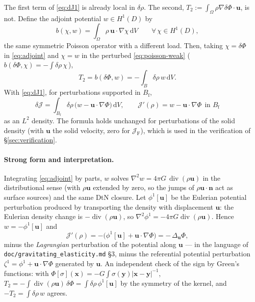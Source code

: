 \documentclass[11pt]{article}
\newcommand{\Jf}{\mathscr{J}}  %
\newcommand{\Bf}{B_{\mathrm{f}}}
\newcommand{\bu}{\mathbf{u}}
\newcommand{\bx}{\mathbf{x}}
\newcommand{\bn}{\mathbf{n}}
\newcommand{\dV}{\,\mathrm{d}V}
\renewcommand{\div}{\operatorname{div}}
\newcommand{\JF}{\Jf _{\mathrm{F}}}
\begin{document}
The first term of \eqref{eq:dJ1} is already local in $\delta\rho$. The
second, $T_2 := \int_\Omega\rho\nabla\delta\Phi\cdot\bu$, is not. Define
the adjoint potential $w\in H^1(D)$ by
\begin{equation}
  b(\chi, w) = \int_\Omega \rho\,\bu\cdot\nabla\chi\dV
  \qquad\forall\,\chi\in H^1(D),
  \label{eq:adjoint}
\end{equation}
the same symmetric Poisson operator with a different load. Then, taking
$\chi = \delta\Phi$ in \eqref{eq:adjoint} and $\chi = w$ in the
perturbed \eqref{eq:poisson-weak} (\,$b(\delta\Phi,\chi) =
-\int\delta\rho\,\chi$\,),
\begin{equation}
  T_2 = b(\delta\Phi, w) = -\int_B \delta\rho\, w\dV .
\end{equation}
With \eqref{eq:dJ1}, for perturbations supported in $\Bf$,
\begin{equation}
  \boxed{\;\delta \Jf  = \int_{\Bf}\delta\rho\,\bigl(w - \bu\cdot\nabla\Phi\bigr)\dV,
  \qquad \Jf'(\rho) = w - \bu\cdot\nabla\Phi \ \ \text{in } \Bf\; }
  \label{eq:gradient}
\end{equation}
as an $L^2$ density. The formula holds unchanged for perturbations of
the solid density (with $\bu$ the solid velocity, zero for $\JF$), which
is used in the verification of \S\ref{sec:verification}.

\paragraph{Strong form and interpretation.} Integrating
\eqref{eq:adjoint} by parts, $w$ solves $\nabla^2 w = 4\pi G\,\div(\rho\bu)$
in the distributional sense (with $\rho\bu$ extended by zero, so the
jumps of $\rho\bu\cdot\bn$ act as surface sources) and the same DtN
closure. Let $\phi^{1}[\bu]$ be the Eulerian potential perturbation
produced by transporting the density with displacement $\bu$: the
Eulerian density change is $-\div(\rho\bu)$, so $\nabla^2\phi^1 =
-4\pi G\div(\rho\bu)$. Hence $w = -\phi^1[\bu]$ and
\begin{equation}
  \Jf'(\rho) = -\bigl(\phi^{1}[\bu] + \bu\cdot\nabla\Phi\bigr)
  = -\,\Delta_{\bu}\Phi ,
  \label{eq:lagrangian}
\end{equation}
minus the \emph{Lagrangian} perturbation of the potential along $\bu$ ---
in the language of \texttt{doc/gravitating\_elasticity.md} \S3, minus the
referential potential perturbation $\zeta^1 = \phi^1 + \bu\cdot\nabla\Phi$
generated by $\bu$. An independent check of the sign by Green's
functions: with $\Phi[\sigma](\bx) = -G\int\sigma(\mathbf{y})|\bx-\mathbf{y}|^{-1}$,
$T_2 = -\int\div(\rho\bu)\,\delta\Phi = \int\delta\rho\,\phi^1[\bu]$ by
the symmetry of the kernel, and $-T_2 = \int\delta\rho\,w$ agrees.
\end{document}
